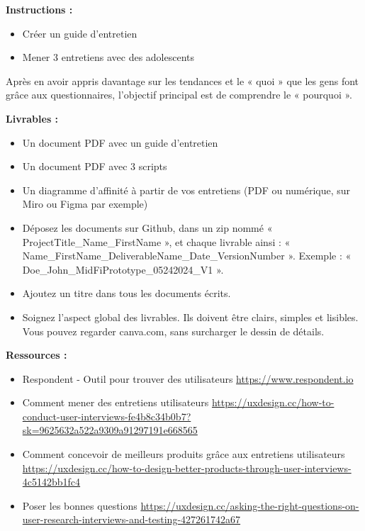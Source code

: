 \makeheaderfiles

\textbf{Instructions :}

\begin{itemize}
\item Créer un guide d'entretien
\item Mener 3 entretiens avec des adolescents
\end{itemize}

Après en avoir appris davantage sur les tendances et le « quoi » que les gens font grâce aux questionnaires, l'objectif principal est de comprendre le « pourquoi ».

\textbf{Livrables :}

\begin{itemize}
\item Un document PDF avec un guide d'entretien
\item Un document PDF avec 3 scripts
\item Un diagramme d'affinité à partir de vos entretiens (PDF ou numérique, sur Miro ou Figma par exemple)
\item Déposez les documents sur Github, dans un zip nommé « ProjectTitle\_Name\_FirstName », et chaque livrable ainsi : « Name\_FirstName\_DeliverableName\_Date\_VersionNumber ». Exemple : « Doe\_John\_MidFiPrototype\_05242024\_V1 ».
\item Ajoutez un titre dans tous les documents écrits.
\item Soignez l'aspect global des livrables. Ils doivent être clairs, simples et lisibles. Vous pouvez regarder canva.com, sans surcharger le dessin de détails.
\end{itemize}

\textbf{Ressources :}

\begin{itemize}
\item Respondent - Outil pour trouver des utilisateurs \url{https://www.respondent.io}
\item Comment mener des entretiens utilisateurs \url{https://uxdesign.cc/how-to-conduct-user-interviews-fe4b8c34b0b7?sk=9625632a522a9309a91297191e668565}
\item Comment concevoir de meilleurs produits grâce aux entretiens utilisateurs \url{https://uxdesign.cc/how-to-design-better-products-through-user-interviews-4c5142bb1fc4}
\item Poser les bonnes questions \url{https://uxdesign.cc/asking-the-right-questions-on-user-research-interviews-and-testing-427261742a67}
\end{itemize}

